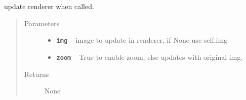 \documentclass[letterpaper,10pt,english]{sphinxmanual}
\begin{document}
\begin{fulllineitems}
\begin{fulllineitems}
\label{RRtoolbox.lib:RRtoolbox.lib.plotter.matchExplorer.updaterenderer}
update renderer when called.
\begin{quote}\begin{description}
\item[{Parameters}] \leavevmode\begin{itemize}
\item {} 
\textbf{\texttt{img}} -- image to update in renderer, if None use self.img

\item {} 
\textbf{\texttt{zoom}} -- True to enable zoom, else updates with original img.

\end{itemize}

\item[{Returns}] \leavevmode
None

\end{description}\end{quote}

\end{fulllineitems}


\end{fulllineitems}

\end{document}
